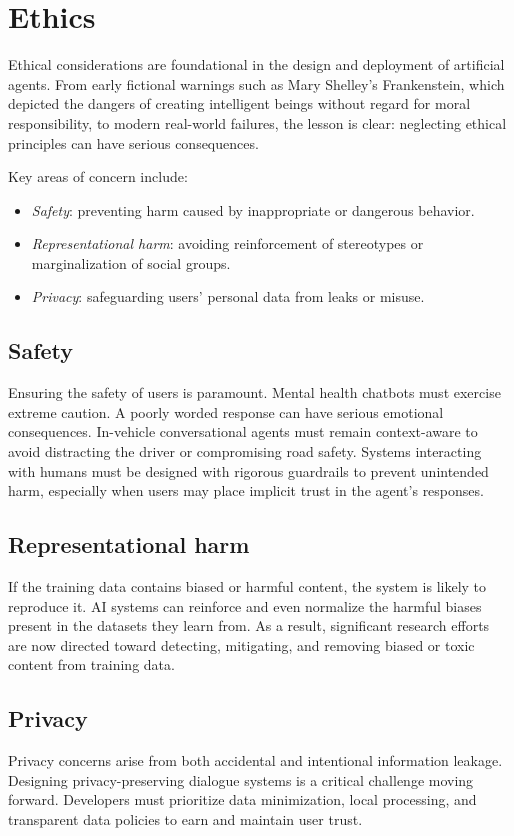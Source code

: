 \section{Ethics}

Ethical considerations are foundational in the design and deployment of artificial agents. 
From early fictional warnings such as Mary Shelley's Frankenstein, which depicted the dangers of creating intelligent beings without regard for moral responsibility, to modern real-world failures, the lesson is clear: neglecting ethical principles can have serious consequences.

Key areas of concern include:
\begin{itemize}
    \item \textit{Safety}: preventing harm caused by inappropriate or dangerous behavior.
    \item \textit{Representational harm}: avoiding reinforcement of stereotypes or marginalization of social groups.
    \item \textit{Privacy}: safeguarding users' personal data from leaks or misuse.
\end{itemize}

\subsection{Safety}
Ensuring the safety of users is paramount. 
Mental health chatbots must exercise extreme caution. 
A poorly worded response can have serious emotional consequences.
In-vehicle conversational agents must remain context-aware to avoid distracting the driver or compromising road safety.
Systems interacting with humans must be designed with rigorous guardrails to prevent unintended harm, especially when users may place implicit trust in the agent’s responses.

\subsection{Representational harm}
If the training data contains biased or harmful content, the system is likely to reproduce it.
AI systems can reinforce and even normalize the harmful biases present in the datasets they learn from.
As a result, significant research efforts are now directed toward detecting, mitigating, and removing biased or toxic content from training data.

\subsection{Privacy}
Privacy concerns arise from both accidental and intentional information leakage. 
Designing privacy-preserving dialogue systems is a critical challenge moving forward. 
Developers must prioritize data minimization, local processing, and transparent data policies to earn and maintain user trust.
